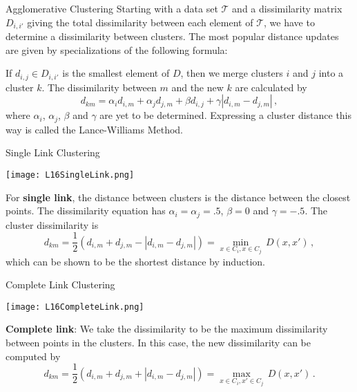 \documentclass[10pt, table, dvipsnames,xcdraw, handout]{beamer}
\newcommand{\cT}{\ensuremath{\mathcal{T}}}
\begin{document}
\begin{frame}[fragile]{Agglomerative Clustering}
Starting with a data set $\mathcal{T}$ and a dissimilarity matrix $D_{i,i'}$ giving the total dissimilarity between each element of $\cT$, we have to determine a dissimilarity between clusters. The most popular distance updates are given by specializations of the following formula: \pause 

If $d_{i,j}\in D_{i,i'}$ is the smallest element of $D$, then we merge clusters $i$ and $j$ into a cluster $k$. \pause The dissimilarity between $m$ and the new $k$ are calculated by
$$
d_{km} =  \alpha_i d_{i,m} +  \alpha_j  d_{j,m} + \beta d_{i,j} + \gamma|d_{i,m} - d_{j,m}|\,,
$$\pause
where $\alpha_i$, $\alpha_j$, $\beta$ and $\gamma$ are yet to be determined. \pause Expressing a cluster distance this way is called the Lance-Williams Method. 
\end{frame}


\begin{frame}[fragile]{Single Link Clustering}
  \begin{minipage}[t][0.5\textheight][t]{\textwidth}
	\centering \texttt{[image: L16SingleLink.png]}
  \end{minipage}
  \vfill
\begin{minipage}[t][0.5\textheight][t]{\textwidth}
For \textbf{single link}, the distance between clusters is the distance between the closest points. The dissimilarity equation has $\alpha_i = \alpha_j = .5$, $\beta = 0$ and $\gamma = -.5$.  The cluster dissimilarity is
$$
d_{km} =  \frac12(d_{i,m} +  d_{j,m} - |d_{i,m} - d_{j,m}|) = \min_{x\in C_i, x\in C_j}\, D(x,x')\,,
$$
which can be shown to be the shortest distance by induction. 
\end{minipage}
\end{frame}



\begin{frame}[fragile]{Complete Link Clustering}
  \begin{minipage}[t][0.5\textheight][t]{\textwidth}
	\centering \texttt{[image: L16CompleteLink.png]}
  \end{minipage}
  \vfill
\begin{minipage}[t][0.5\textheight][t]{\textwidth}
\textbf{Complete link}: We take the dissimilarity to be the maximum dissimilarity between points in the clusters. In this case, the new dissimilarity can be computed by
$$
d_{km} =  \frac12(d_{i,m} +  d_{j,m} + |d_{i,m} - d_{j,m}|) = \max_{x\in C_i, x'\in C_j}\, D(x,x')\,.
$$
\end{minipage}
\end{frame}
\end{document}
